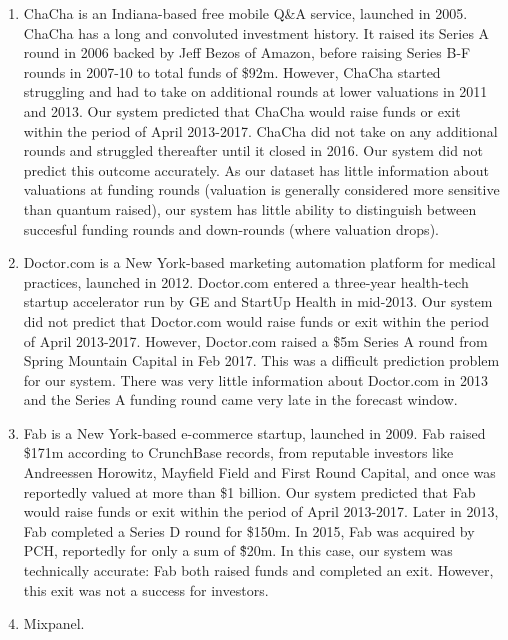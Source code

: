 ﻿\documentclass[../thesis/thesis.tex]{subfiles}
\begin{document}
\begin{enumerate}

\item ChaCha is an Indiana-based free mobile Q\&A service, launched in 2005. ChaCha has a long and convoluted investment history. It raised its Series A round in 2006 backed by Jeff Bezos of Amazon, before raising Series B-F rounds in 2007-10 to total funds of \$92m. However, ChaCha started struggling and had to take on additional rounds at lower valuations in 2011 and 2013. Our system predicted that ChaCha would raise funds or exit within the period of April 2013-2017. ChaCha did not take on any additional rounds and struggled thereafter until it closed in 2016. Our system did not predict this outcome accurately. As our dataset has little information about valuations at funding rounds (valuation is generally considered more sensitive than quantum raised), our system has little ability to distinguish between succesful funding rounds and down-rounds (where valuation drops). 

\item Doctor.com is a New York-based marketing automation platform for medical practices, launched in 2012. Doctor.com entered a three-year health-tech startup accelerator run by GE and StartUp Health in mid-2013. Our system did not predict that Doctor.com would raise funds or exit within the period of April 2013-2017. However, Doctor.com raised a \$5m Series A round from Spring Mountain Capital in Feb 2017. This was a difficult prediction problem for our system. There was very little information about Doctor.com in 2013 and the Series A funding round came very late in the forecast window. 

\item Fab is a New York-based e-commerce startup, launched in 2009. Fab raised \$171m according to CrunchBase records, from reputable investors like Andreessen Horowitz, Mayfield Field and First Round Capital, and once was reportedly valued at more than \$1 billion. Our system predicted that Fab would raise funds or exit within the period of April 2013-2017. Later in 2013, Fab completed a Series D round for \$150m. In 2015, Fab was acquired by PCH, reportedly for only a sum of \~\$20m. In this case, our system was technically accurate: Fab both raised funds and completed an exit. However, this exit was not a success for investors.

\item Mixpanel. %

\end{enumerate}
\end{document}
